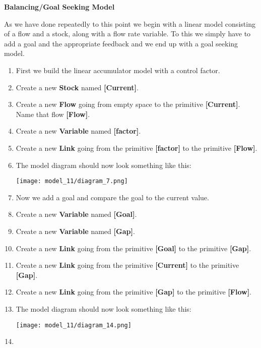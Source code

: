 \documentclass[]{memoir}
\makeatletter
\def\maxwidth{\ifdim\Gin@nat@width>\linewidth\linewidth
\else\Gin@nat@width\fi}
\let\Oldincludegraphics\includegraphics
\renewcommand{\includegraphics}[1]{\Oldincludegraphics[width=\maxwidth]{#1}}
\newcommand{\p}[1]{\textbf{{[}#1{]}}}
\renewcommand{\a}[1]{\textbf{#1}}
\makeatother
\begin{document}
\begin{oframed}\textbf{Balancing/Goal Seeking Model} 

 As we have done repeatedly to this point we begin with a linear model consisting of a flow and a stock, along with a flow rate variable. To this we simply have to add a goal and the appropriate feedback and we end up with a goal seeking model.

\begin{enumerate}
\item 

First we build the linear accumulator model with a control factor.


\item Create a new \a{Stock} named \p{Current}.
\item Create a new \a{Flow} going from empty space to the primitive \p{Current}. Name that flow \p{Flow}.
\item Create a new \a{Variable} named \p{factor}.
\item Create a new \a{Link} going from the primitive \p{factor} to the primitive \p{Flow}.
\item The model diagram should now look something like this: \par \begin{minipage}{\linewidth}  \centering \texttt{[image: model\_11/diagram\_7.png]}
\end{minipage}
\item 

Now we add a goal and compare the goal to the current value.


\item Create a new \a{Variable} named \p{Goal}.
\item Create a new \a{Variable} named \p{Gap}.
\item Create a new \a{Link} going from the primitive \p{Goal} to the primitive \p{Gap}.
\item Create a new \a{Link} going from the primitive \p{Current} to the primitive \p{Gap}.
\item Create a new \a{Link} going from the primitive \p{Gap} to the primitive \p{Flow}.
\item The model diagram should now look something like this: \par \begin{minipage}{\linewidth}  \centering \texttt{[image: model\_11/diagram\_14.png]}
\end{minipage}
\item 


\end{enumerate}
\end{oframed}
\end{document}
